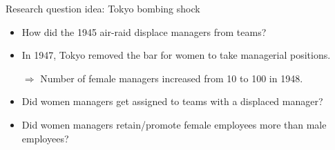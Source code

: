 \begin{frame}[noframenumbering]{Research question idea: Tokyo bombing shock}
    \begin{itemize}[<+->]
        \item How did the 1945 air-raid displace managers from teams?

        \item In 1947, Tokyo removed the bar for women to take managerial positions.

        $\Rightarrow$ Number of female managers increased from 10 to 100 in 1948.

        \item Did women managers get assigned to teams with a displaced manager?
        \item Did women managers retain/promote female employees more than male employees?
    \end{itemize}
\end{frame}
